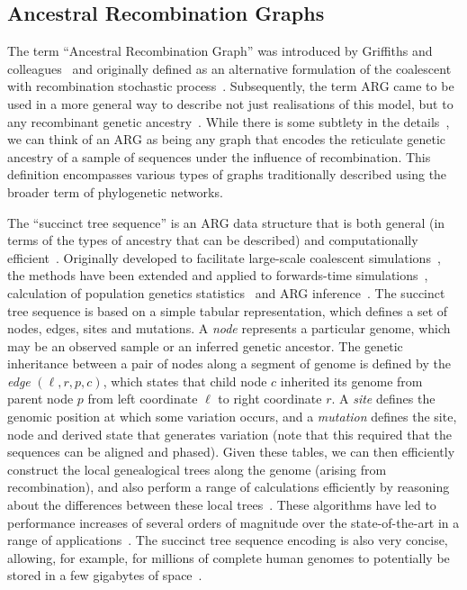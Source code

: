 \documentclass{article}
\begin{document}

\subsection{Ancestral Recombination Graphs}
\label{sec:args}
The term ``Ancestral Recombination Graph'' was introduced by
Griffiths and colleagues~\citep{Griffiths1991-two,Griffiths1998-ancestral}
and originally defined as an alternative formulation of the coalescent
with recombination stochastic process~\citep{Hudson1983-properties}.
Subsequently, the term ARG came to be used in a more general way to
describe not just realisations of this model, but to any
recombinant genetic ancestry~\citep{Minichiello2006-mapping,Zhang2023-lf}.
While there is some subtlety in the details~\citep{Wong2023-efficient},
we can think of an ARG as being any graph that encodes the
reticulate genetic ancestry of a sample of sequences under
the influence of recombination.
This definition encompasses various types of graphs traditionally
described using the broader term of phylogenetic networks.

The ``succinct tree sequence'' is an ARG data structure
that is both general (in terms of the types of ancestry that can
be described) and computationally efficient~\citep{Wong2023-efficient}.
Originally developed to facilitate large-scale coalescent
simulations~\citep{Kelleher2016-wk}, the methods have been
extended and applied to forwards-time
simulations~\citep{Kelleher2018-xc,Haller2018-tree},
calculation of population genetics statistics~\citep{Ralph2020-efficiently}
and ARG inference~\citep{Kelleher2019-ba,Wohns2022-th}.
The succinct tree sequence is based on a simple tabular representation,
which defines a set of nodes, edges, sites and mutations. A \emph{node}
represents a particular genome, which may be an observed sample
or an inferred genetic ancestor. The genetic inheritance between
a pair of nodes along a segment of genome is defined by
the \emph{edge} $(\ell, r, p, c)$, which states that
child node $c$ inherited its genome from parent node $p$
from left coordinate $\ell$ to right coordinate $r$. A \emph{site}
defines the genomic position at which some variation occurs,
and a \emph{mutation} defines the site, node and derived state
that generates variation (note that this required that the sequences can be aligned and phased).
Given these tables, we can then efficiently construct the local
genealogical trees along the genome (arising from recombination),
and also perform a range of calculations efficiently by
reasoning about the differences between these local
trees~\citep{Kelleher2016-wk,Ralph2020-efficiently}. These
algorithms have led to performance increases of several orders
of magnitude over the state-of-the-art in a range of
applications~\citep{Kelleher2016-wk,Kelleher2018-xc,Kelleher2019-ba,
Ralph2020-efficiently,Baumdicker2022-ep}.
The succinct tree sequence encoding
is also very concise, allowing, for example, for millions of
complete human genomes to potentially be stored in a few gigabytes of
space~\citep{Kelleher2019-ba}.
\end{document}
